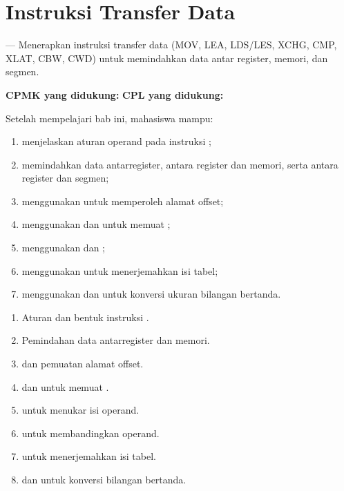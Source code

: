 \documentclass[../../main.tex]{subfiles}
\begin{document}
\chapter{Instruksi Transfer Data}
\label{chap:transfer-data}


\begin{subcpmkbox}
\vspace{1.1em}
 --- Menerapkan instruksi transfer data (MOV, LEA,
LDS/LES, XCHG, CMP, XLAT, CBW, CWD) untuk memindahkan data antar
register, memori, dan segmen.

\vspace{0.4em}
\textbf{CPMK yang didukung:}  \quad\textbullet\quad
\textbf{CPL yang didukung:} 
\end{subcpmkbox}

\begin{tujuanbox}
\vspace{1.1em}
Setelah mempelajari bab ini, mahasiswa mampu:
\begin{enumerate}
    \item menjelaskan aturan operand pada instruksi ;
    \item memindahkan data antarregister, antara register dan memori,
          serta antara register dan segmen;
    \item menggunakan  untuk memperoleh alamat offset;
    \item menggunakan  dan  untuk memuat
          ;
    \item menggunakan  dan ;
    \item menggunakan  untuk menerjemahkan isi tabel;
    \item menggunakan  dan  untuk konversi ukuran
          bilangan bertanda.
\end{enumerate}
\end{tujuanbox}

\begin{materibox}
\vspace{1.1em}
\begin{enumerate}
    \item Aturan dan bentuk instruksi .
    \item Pemindahan data antarregister dan memori.
    \item {} dan pemuatan alamat offset.
    \item {} dan  untuk memuat .
    \item {} untuk menukar isi operand.
    \item {} untuk membandingkan operand.
    \item {} untuk menerjemahkan isi tabel.
    \item {} dan  untuk konversi bilangan bertanda.
\end{enumerate}
\end{materibox}










\end{document}
